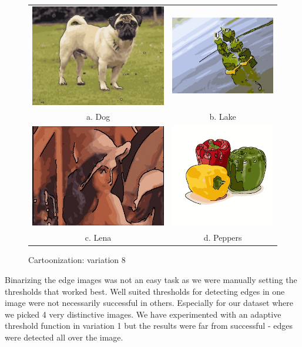 \documentclass[]{IEEEtran}
\begin{document}
    \begin{figure}[h]
      \centering
      \begin{tabular}{c c}
      \includegraphics[width=0.35\linewidth]{./figures/cartoonize/dog-3-2-2-var8.jpg} &
      \includegraphics[width=0.35\linewidth]{./figures/cartoonize/lake-3-2-2-var8.jpg} \\
      a. Dog & b. Lake \\
      \includegraphics[width=0.35\linewidth]{./figures/cartoonize/lena-3-2-2-var8.jpg} &
      \includegraphics[width=0.35\linewidth]{./figures/cartoonize/peppers-3-2-2-var8.png} \\
      c. Lena & d. Peppers \\
      \end{tabular}
      \caption{Cartoonization: variation 8}
      \label{figure:cartonized-var8}
    \end{figure}

    Binarizing the edge images was not an easy task as we were manually setting the thresholds that worked best.
    Well suited thresholds for detecting edges in one image were not necessarily successful in others.
    Especially for our dataset where we picked 4 very distinctive images.
    We have experimented with an adaptive threshold function in variation 1 but the results were far from successful -
    edges were detected all over the image.
\end{document}
